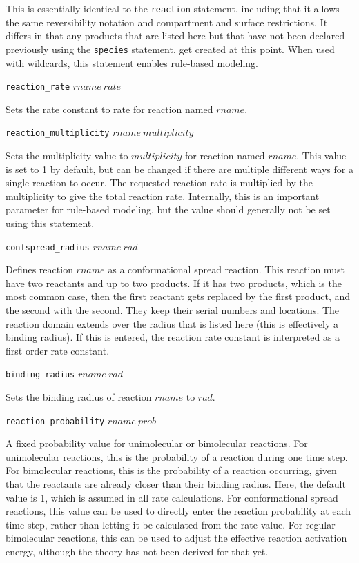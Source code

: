 \documentclass {scrbook}
\newcommand {\ttt} {\texttt}
\begin{document}
\begin{description}
This is essentially identical to the \ttt{reaction} statement, including that it allows the same reversibility notation and compartment and surface restrictions. It differs in that any products that are listed here but that have not been declared previously using the \ttt{species} statement, get created at this point. When used with wildcards, this statement enables rule-based modeling.

\item{\ttt{reaction\_rate} $rname\ rate$}

Sets the rate constant to rate for reaction named $rname$.

\item{\ttt{reaction\_multiplicity} $rname\ multiplicity$}

Sets the multiplicity value to $multiplicity$ for reaction named $rname$. This value is set to 1 by default, but can be changed if there are multiple different ways for a single reaction to occur. The requested reaction rate is multiplied by the multiplicity to give the total reaction rate. Internally, this is an important parameter for rule-based modeling, but the value should generally not be set using this statement.

\item{\ttt{confspread\_radius} $rname\ rad$}

Defines reaction $rname$ as a conformational spread reaction. This reaction must have two reactants and up to two products. If it has two products, which is the most common case, then the first reactant gets replaced by the first product, and the second with the second. They keep their serial numbers and locations. The reaction domain extends over the radius that is listed here (this is effectively a binding radius). If this is entered, the reaction rate constant is interpreted as a first order rate constant.

\item{\ttt{binding\_radius} $rname\ rad$}

Sets the binding radius of reaction $rname$ to $rad$.

\item{\ttt{reaction\_probability} $rname\ prob$}

A fixed probability value for unimolecular or bimolecular reactions. For unimolecular reactions, this is the probability of a reaction during one time step. For bimolecular reactions, this is the probability of a reaction occurring, given that the reactants are already closer than their binding radius. Here, the default value is 1, which is assumed in all rate calculations. For conformational spread reactions, this value can be used to directly enter the reaction probability at each time step, rather than letting it be calculated from the rate value. For regular bimolecular reactions, this can be used to adjust the effective reaction activation energy, although the theory has not been derived for that yet.


\end{description}
\end{document}
